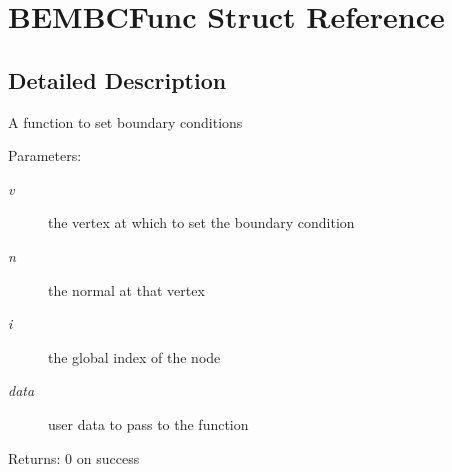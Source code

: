 \section{BEMBCFunc Struct Reference}
\label{structBEMBCFunc}


\subsection{Detailed Description}
A function to set boundary conditions

\begin{Desc}
\item[Parameters:]
\begin{description}
\item[{\em v}]the vertex at which to set the boundary condition \item[{\em n}]the normal at that vertex \item[{\em i}]the global index of the node \item[{\em data}]user data to pass to the function\end{description}
\end{Desc}
\begin{Desc}
\item[Returns:]0 on success \end{Desc}


